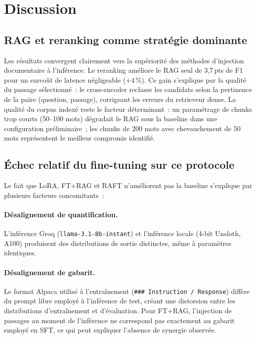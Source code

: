 \documentclass[10pt,journal,compsoc]{IEEEtran}
\begin{document}
\section{Discussion}
\label{sec:discussion}

\subsection{RAG et reranking comme stratégie dominante}

Les résultats convergent clairement vers la supériorité des méthodes
d'injection documentaire à l'inférence. Le reranking améliore le RAG
seul de 3,7\,pts de F1 pour un surcoût de latence négligeable
($+$4\,\%). Ce gain s'explique par la qualité du passage sélectionné~:
le cross-encoder reclasse les candidats selon la pertinence de la
paire (question, passage), corrigeant les erreurs du retrieveur dense.
La qualité du corpus indexé reste le facteur déterminant~: un
paramétrage de chunks trop courts (50--100 mots) dégradait le RAG
sous la baseline dans une configuration préliminaire~; les chunks
de 200 mots avec chevauchement de 50 mots représentent le meilleur
compromis identifié.

\subsection{Échec relatif du fine-tuning sur ce protocole}

Le fait que LoRA, FT+RAG et RAFT n'améliorent pas la baseline
s'explique par plusieurs facteurs concomitants~:

\paragraph{Désalignement de quantification.}
L'inférence Groq (\texttt{llama-3.1-8b-instant}) et l'inférence
locale (4-bit Unsloth, A100) produisent des distributions de sortie
distinctes, même à paramètres identiques.

\paragraph{Désalignement de gabarit.}
Le format Alpaca utilisé à l'entraînement (\texttt{\#\#\# Instruction
/ Response}) diffère du prompt libre employé à l'inférence de test,
créant une distorsion entre les distributions d'entraînement et
d'évaluation. Pour FT+RAG, l'injection de passages au moment de
l'inférence ne correspond pas exactement au gabarit employé en SFT,
ce qui peut expliquer l'absence de synergie observée.
\end{document}
